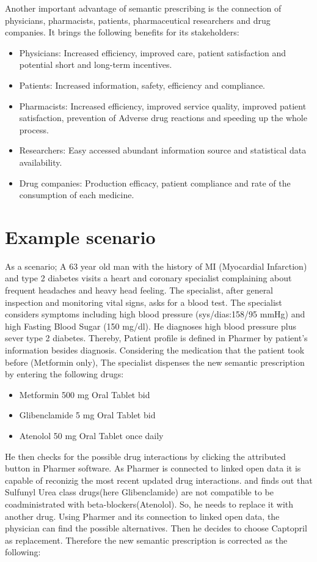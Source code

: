 \documentclass[10pt, conference, compsocconf]{IEEEtran}
\begin{document}
Another important advantage of semantic prescribing is the connection of physicians, pharmacists, patients, pharmaceutical researchers and drug companies.
It brings the following benefits for its stakeholders:
\begin{itemize}
\item Physicians: Increased efficiency, improved care, patient satisfaction and potential short and long-term incentives.
\item Patients: Increased information, safety, efficiency and compliance.
\item Pharmacists: Increased efficiency, improved service quality, improved patient satisfaction,  prevention of Adverse drug reactions and speeding up the whole process.
\item Researchers: Easy accessed abundant information source and statistical data availability.
\item Drug companies: Production efficacy, patient compliance and rate of the consumption of each medicine. 
\end{itemize}


\section{Example scenario}
\label{sec:example}
As a scenario; A 63 year old man with the history of MI (Myocardial Infarction) and type 2 diabetes visits a heart and coronary specialist complaining about frequent headaches and heavy head feeling. The specialist, after general inspection and monitoring vital signs, asks for a blood test. The specialist considers symptoms including high blood pressure (sys/dias:158/95 mmHg) and high Fasting Blood Sugar (150 mg/dl). He diagnoses high blood pressure plus sever type 2 diabetes.
Thereby, Patient profile is defined in Pharmer by patient's information besides diagnosis.
Considering the medication that the patient took before (Metformin only), The specialist dispenses the new semantic prescription by entering the following drugs:

\begin{itemize}
\item {Metformin} 500 mg Oral Tablet bid
\item {Glibenclamide} 5 mg Oral Tablet bid
\item {Atenolol} 50 mg Oral Tablet once daily
\end{itemize}

He then checks for the possible drug interactions by clicking the attributed button in Pharmer software.
As Pharmer is connected to linked open data it is capable of reconizig the most recent updated drug interactions.
 and finds out that Sulfunyl Urea class drugs(here Glibenclamide) are not compatible to be coadministrated with beta-blockers(Atenolol).
So, he needs to replace it with another drug.
Using Pharmer and its connection to linked open data, the physician can find the possible alternatives.
Then he decides to choose Captopril as replacement.
Therefore the new semantic prescription is corrected as the following:
\end{document}
